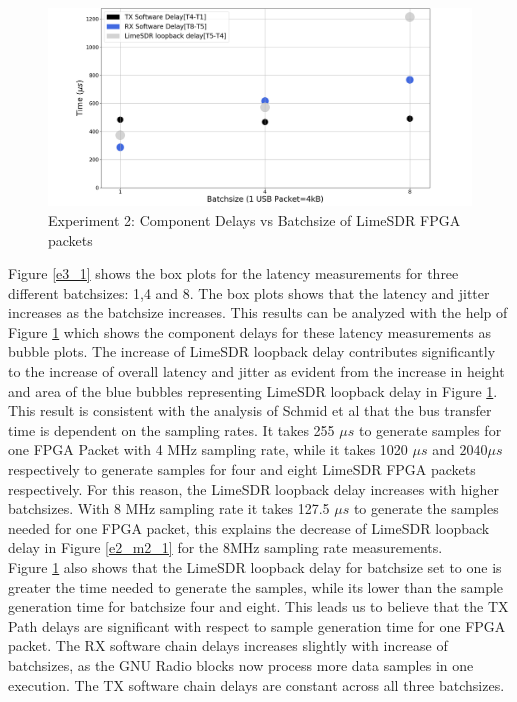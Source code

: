 \begin{figure}[h!]
\centering
\includegraphics[width=\textwidth]{Thesis/Figure/E3M2-2.png}
\caption{Experiment 2: Component Delays vs Batchsize of LimeSDR FPGA packets}
\label{e3_2}
\end{figure}

Figure \ref{e3_1} shows the box plots for the latency measurements for three different batchsizes: 1,4 and 8. 
The box plots shows that the latency and jitter increases as the batchsize increases.
This results can be analyzed with the help of Figure \ref{e3_2} which shows the component delays for these latency measurements as bubble plots.
The increase of LimeSDR loopback delay contributes significantly to the increase of overall latency and jitter as evident from the increase in height and area of the blue bubbles representing LimeSDR loopback delay in Figure \ref{e3_2}.
This result is consistent with the analysis of Schmid et al \cite{schmid_experimental_2007} that the bus transfer time is dependent on the sampling rates.
It takes  255 $\mu s$ to generate samples for one FPGA Packet with 4 MHz sampling rate, while it takes 1020 $\mu s$ and $2040 \mu s$ respectively to generate samples for four and eight LimeSDR FPGA packets respectively.
For this reason, the LimeSDR loopback delay increases with higher batchsizes.
With 8 MHz sampling rate it takes 127.5 $\mu s$ to generate the samples needed for one FPGA packet, this explains the decrease of LimeSDR loopback delay in Figure \ref{e2_m2_1} for the 8MHz sampling rate measurements.\\

Figure \ref{e3_2} also shows that the LimeSDR loopback delay for batchsize set to one is greater the time needed to generate the samples, while its lower than the sample generation time for batchsize four and eight.
This leads us to believe that the TX Path delays are significant with respect to sample generation time for one FPGA packet.
The RX software chain delays increases slightly with increase of batchsizes, as the GNU Radio blocks now process more data samples in one execution.
The TX software chain delays are constant across all three batchsizes.\\

